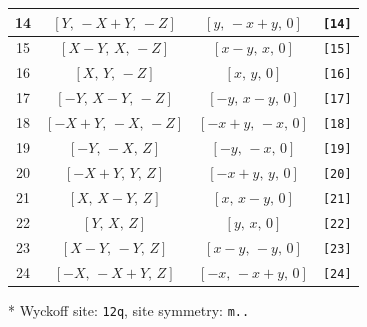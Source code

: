 \documentclass[fleqn,8pt]{jsarticle}
\begin{document}
\begin{longtable}{cccc}
14 & $\left[ Y,\, - X + Y,\, - Z \right]$ & $\left[ y,\, - x + y,\, 0 \right]$ & {\tt [14]} \\ \hline
15 & $\left[ X - Y,\, X,\, - Z \right]$ & $\left[ x - y,\, x,\, 0 \right]$ & {\tt [15]} \\ \hline
16 & $\left[ X,\, Y,\, - Z \right]$ & $\left[ x,\, y,\, 0 \right]$ & {\tt [16]} \\ \hline
17 & $\left[ - Y,\, X - Y,\, - Z \right]$ & $\left[ - y,\, x - y,\, 0 \right]$ & {\tt [17]} \\ \hline
18 & $\left[ - X + Y,\, - X,\, - Z \right]$ & $\left[ - x + y,\, - x,\, 0 \right]$ & {\tt [18]} \\ \hline
19 & $\left[ - Y,\, - X,\, Z \right]$ & $\left[ - y,\, - x,\, 0 \right]$ & {\tt [19]} \\ \hline
20 & $\left[ - X + Y,\, Y,\, Z \right]$ & $\left[ - x + y,\, y,\, 0 \right]$ & {\tt [20]} \\ \hline
21 & $\left[ X,\, X - Y,\, Z \right]$ & $\left[ x,\, x - y,\, 0 \right]$ & {\tt [21]} \\ \hline
22 & $\left[ Y,\, X,\, Z \right]$ & $\left[ y,\, x,\, 0 \right]$ & {\tt [22]} \\ \hline
23 & $\left[ X - Y,\, - Y,\, Z \right]$ & $\left[ x - y,\, - y,\, 0 \right]$ & {\tt [23]} \\ \hline
24 & $\left[ - X,\, - X + Y,\, Z \right]$ & $\left[ - x,\, - x + y,\, 0 \right]$ & {\tt [24]} \\
\end{longtable}
* Wyckoff site: {\tt 12q}, site symmetry: {\tt m..}
\renewcommand{\arraystretch}{1.2}
\end{document}
